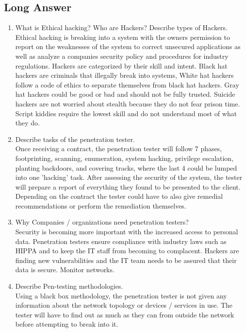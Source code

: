 \subsection{Long Answer}
\begin{enumerate}
    \item What is Ethical hacking? Who are Hackers? Describe types of Hackers.\\
    Ethical hacking is breaking into a system with the owners permission to report on the weaknesses of the system to correct unsecured applications as well as analyze a companies security policy and procedures for industry regulations.
    Hackers are categorized by their skill and intent.
    Black hat hackers are criminals that illegally break into systems, White hat hackers follow a code of ethics to separate themselves from black hat hackers.
    Gray hat hackers could be good or bad and should not be fully trusted.
    Suicide hackers are not worried about stealth because they do not fear prison time.
    Script kiddies require the lowest skill and do not understand most of what they do. 
    \item Describe tasks of the penetration tester.\\
    Once receiving a contract, the penetration tester will follow 7 phases, footprinting, scanning, enumeration, system hacking, privilege escalation, planting backdoors, and covering tracks, where the last 4 could be lumped into one 'hacking' task.
    After assessing the security of the system, the tester will prepare a report of everything they found to be presented to the client.
    Depending on the contract the tester could have to also give remedial recommendations or perform the remediation themselves.
    \item Why Companies / organizations need penetration testers?\\
    Security is becoming more important with the increased access to personal data.
    Penetration testers ensure compliance with industry laws such as HIPPA and to keep the IT staff from becoming to complacent.
    Hackers are finding new vulnerabilities and the IT team needs to be assured that their data is secure.
    Monitor networks.
    \item Describe Pen-testing methodologies.\\
    Using a black box methodology, the penetration tester is not given any information about the network topology or devices / services in use.
    The tester will have to find out as much as they can from outside the network before attempting to break into it.

\end{enumerate}
